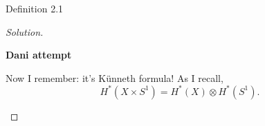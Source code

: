 \begin{thing3}{Definition 2.1}
\begin{proof}[Solution]
\begin{enumerate}
	\iffalse Right so a form \(\alpha\) of the circle bundle is a linear operator on \(TM\). So what is \(TM\). It is a point and a vector, so \((p,e^{it}) \in X \times S^1\) and \((v,r)\in TX \oplus TS^1\). And \(\alpha\) will map \((v,r)\), or some tuple of vectors, to a number.

	I would like to have an expression for \(\alpha\) decomposed as a form on \(X\) and a form on \(S^1\). Well, just as \(T(M)=T(X) \oplus  T(S^1)\) we should have \(T^*(M)=T^*(X)\oplus T^*(S^1)\). And immediately we get that \(\alpha = \omega \oplus \eta\).

	So the cohomology class of \(\alpha\), if it is closed, …
\fi
\textbf{Dani attempt} 

Now I  remember: it's Künneth formula! As I recall,
	\[H^*(X \times S^1)=H^{*}(X) \otimes H^*(S^1).\]


\end{enumerate}
\end{proof}
\end{thing3}
